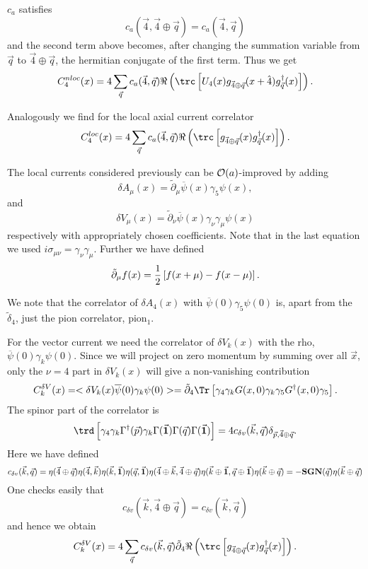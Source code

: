 $c_a$ satisfies
$$ c_a(\vec 4, \vec 4 \oplus \vec q) = c_a(\vec 4, \vec q) $$
and the second term above becomes, after changing the summation variable 
from $\vec q$ to $\vec 4 \oplus \vec q$, the hermitian conjugate of the 
first term. Thus we get 
$$ C^{nloc}_4(x) = 4 \sum_{\vec q} c_a(\vec 4, \vec q) 
 \Re \left( \trc \left[ U_4(x) g_{\vec 4 \oplus \vec q}(x+\hat 4) 
 g_{\vec q}^\dagger (x) \right] \right). $$

Analogously we find for the local axial current correlator
$$ C^{loc}_4(x) = 4 \sum_{\vec q} c_a(\vec 4, \vec q) 
 \Re \left( \trc \left[ g_{\vec 4 \oplus \vec q}(x) 
 g_{\vec q}^\dagger (x) \right] \right). $$


\bigskip

\medskip

The local currents considered previously can be ${\cal O}(a)$-improved by
adding
$$ \delta A_\mu(x) = \tilde \partial_\mu 
 \overline \psi(x) \gamma_5 \psi(x), $$
and
$$ \delta V_\mu(x) = \tilde \partial_\nu 
 \overline \psi(x) \gamma_\nu \gamma_\mu \psi(x) $$
respectively with appropriately chosen coefficients. Note that in the
last equation we used $i \sigma_{\mu \nu} = \gamma_\nu \gamma_\mu$. Further
we have defined
$$ \tilde \partial_\mu f(x) = {1 \over 2} \left[ f(x+\mu) - f(x-\mu)
 \right] .$$

We note that the correlator of $\delta A_4(x)$ with $\overline \psi(0)
\gamma_5 \psi(0)$ is, apart from the $\tilde \delta_4$, just the pion
correlator, pion$_1$.

For the vector current we need the correlator of $\delta V_k(x)$ with the
rho, $\overline \psi(0) \gamma_k \psi(0)$. Since we will project on
zero momentum by summing over all $\vec x$, only the $\nu = 4$ part in
$\delta V_k(x)$ will give a non-vanishing contribution
$$ C^{\delta V}_k(x) = < \delta V_k (x) \overline \psi(0) \gamma_k \psi(0)>
 = \tilde \partial_4 \Tr \left[ \gamma_4 \gamma_k G(x,0) \gamma_k
 \gamma_5 G^\dagger (x,0) \gamma_5 \right] .$$ 
The spinor part of the correlator is
$$ \trd \left[ \gamma_4 \gamma_k \Gamma^\dagger(\vec p) \gamma_k
 \Gamma(\vec {\bf 1}) \Gamma(\vec q) \Gamma(\vec {\bf 1}) \right] = 
 4 c_{\delta v}(\vec k, \vec q) \delta_{\vec p, \vec 4 \oplus \vec q}. $$
Here we have defined
$$ c_{\delta v}(\vec k, \vec q) = \eta(\vec 4 \oplus \vec q)
 \eta(\vec 4, \vec k) \eta(\vec k, \vec {\bf 1}) \eta(\vec q, \vec {\bf 1}) 
 \eta(\vec 4 \oplus \vec k, \vec 4 \oplus \vec q)
 \eta(\vec k \oplus \vec {\bf 1}, \vec q \oplus \vec {\bf 1})
 \eta(\vec k \oplus \vec q) 
 = - {\bf SGN}(\vec q) \eta(\vec k \oplus \vec q) $$
One checks easily that
$$ c_{\delta v}(\vec k, \vec 4 \oplus \vec q) =
 c_{\delta v}(\vec k, \vec q) $$
and hence we obtain
$$ C^{\delta V}_k(x) = 4 \sum_{\vec q} c_{\delta v}(\vec k, \vec q)
 \tilde \partial_4 \Re \left( \trc \left[ g_{\vec 4 \oplus \vec q}(x) 
 g_{\vec q}^\dagger (x) \right] \right). $$


